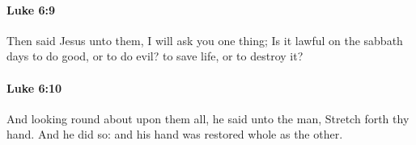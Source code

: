 		\paragraph{Luke 6:9} %
			\label{LUKE-6-9}

			Then said Jesus unto them, I will ask you one thing; Is it lawful on the sabbath days to do good, or to do evil? to save life, or to destroy it?

			\begin{framed}
			\scriptsize
				\begin{compactdesc}
					\item[SBLG] 
				\end{compactdesc}
			\end{framed}

		\paragraph{Luke 6:10} %
			\label{LUKE-6-10}

			And looking round about upon them all, he said unto the man, Stretch forth thy hand. And he did so: and his hand was restored whole as the other.

